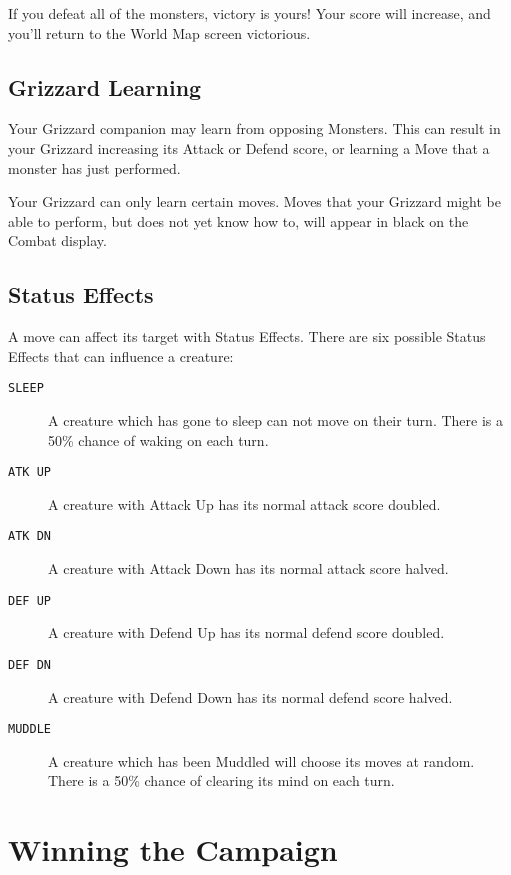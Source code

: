 \documentclass[12pt,openright,book]{memoir}
\begin{document}
If you  defeat all of  the monsters, victory  is yours! Your  score will
increase, and you'll return to the World Map screen victorious.

\subsection{Grizzard Learning}

Your  Grizzard companion  may  learn from  opposing  Monsters. This  can
result  in your  Grizzard  increasing  its Attack  or  Defend score,  or
learning a Move that a monster has just performed.

Your Grizzard  can only  learn certain moves.  Moves that  your Grizzard
might be able to  perform, but does not yet know how  to, will appear in
black on the Combat display.

\subsection{Status Effects}

A move can affect its target with Status Effects. There are six possible
Status Effects that can influence a creature:

\begin{description}
\item[\texttt{SLEEP}] A creature which has gone to sleep can not move on
  their turn. There is a 50\% chance of waking on each turn.
\item[\texttt{ATK UP}] A  creature with Attack Up has  its normal attack
  score doubled.
\item[\texttt{ATK DN}] A creature with Attack Down has its normal attack
  score halved.
\item[\texttt{DEF UP}] A  creature with Defend Up has  its normal defend
  score doubled.
\item[\texttt{DEF DN}] A creature with Defend Down has its normal defend
  score halved.
\item[\texttt{MUDDLE}] A creature which has been Muddled will choose its
  moves at random. There is a 50\% chance of clearing its mind on each turn.
\end{description}

\section{Winning the Campaign}\label{Winning the Campaign}

\ifdefined\DEMO
\end{document}
